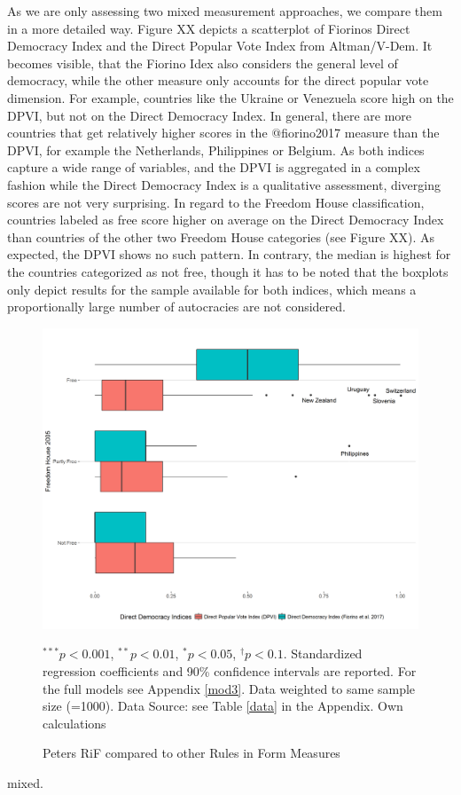 \documentclass{systats}
\begin{document}
 
As we are only assessing two mixed measurement approaches, we compare them in a more detailed way. Figure XX depicts a scatterplot of Fiorinos Direct Democracy Index and the Direct Popular Vote Index from Altman/V-Dem. It becomes visible, that the Fiorino Idex also considers the general level of democracy, while the other measure only accounts for the  direct popular vote dimension. For example, countries like the Ukraine or Venezuela score high on the DPVI, but not on the Direct Democracy Index. In general, there are more countries that get relatively higher scores in the @fiorino2017 measure than the DPVI, for example the Netherlands, Philippines or Belgium. As both indices capture a wide range of variables, and the DPVI is aggregated in a complex fashion while the Direct Democracy Index is a qualitative assessment, diverging scores are not very surprising. In regard to the Freedom House classification, countries labeled as free score higher on average on the Direct Democracy Index than countries of the other two Freedom House categories (see Figure XX). As expected, the DPVI shows no such pattern. In contrary, the median is highest for the countries categorized as not free, though it has to be noted that the boxplots only depict results for the sample available for both indices, which means a  proportionally large number of autocracies are not considered.


\begin{figure}
	\caption{Peters RiF compared to other Rules in Form Measures}
	\label{reg2}
	\includegraphics[width=\textwidth]{images/boxplots_final.png}
	\flushright
	{\scriptsize $^{***}p<0.001$, $^{**}p<0.01$, $^*p<0.05$, $^{\dagger}p<0.1$. Standardized regression coefficients and 90\% confidence intervals are reported. For the full models see Appendix \ref{mod3}. Data weighted to same sample size (=1000). Data Source: see Table \ref{data} in the Appendix. Own calculations  \par}
\end{figure}
mixed.
\end{document}
